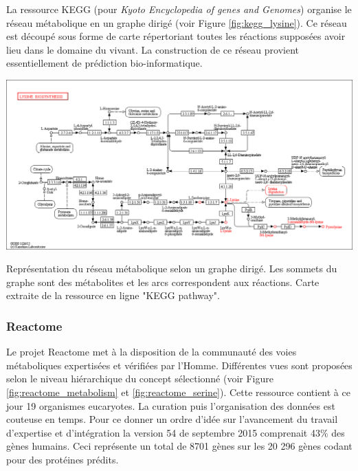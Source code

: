 \begin{refsegment}
    La ressource KEGG (pour \textit{Kyoto Encyclopedia of genes and Genomes}) \cite{ogata1999kegg,kanehisa2000kegg,kanehisa2002kegg,kanehisa2004kegg,aoki2005using,kanehisa2010kegg,kanehisa2017kegg} organise le réseau métabolique en un graphe dirigé (voir Figure \ref{fig:kegg_lysine}). Ce réseau est découpé sous forme de carte répertoriant toutes les réactions supposées avoir lieu dans le domaine du vivant. La construction de ce réseau provient essentiellement de prédiction bio-informatique.
    
    \begin{shadedfigure}
        \centering
        \includegraphics[width=\textwidth]{img/kegg_lysine.png}
        \caption{ Représentation du réseau métabolique selon un graphe dirigé. Les sommets du graphe sont des métabolites et les arcs correspondent aux réactions. Carte extraite de la ressource en ligne "KEGG pathway". }
        \label{fig:kegg_lysine}
    \end{shadedfigure}
    
    \subsubsection{Reactome}
    Le projet Reactome \cite{joshi2005reactome,matthews2009reactome,croft2010reactome,croft2014reactome,fabregat2016reactome} met à la disposition de la communauté des voies métaboliques expertisées et vérifiées par l'Homme. Différentes vues sont proposées selon le niveau hiérarchique du concept sélectionné (voir Figure \ref{fig:reactome_metabolism} et \ref{fig:reactome_serine}). Cette ressource contient à ce jour 19 organismes eucaryotes. La curation puis l'organisation des données est couteuse en temps. Pour ce donner un ordre d'idée sur l'avancement du travail d'expertise et d'intégration la version 54 de septembre 2015 comprenait 43\% des gènes humains. Ceci représente un total de 8701 gènes sur les 20 296 gènes codant pour des protéines prédits.
    

\end{refsegment}

